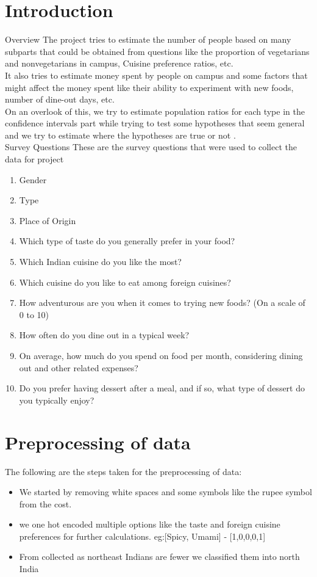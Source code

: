 \documentclass[12pt]{article}
\subtitle{MA4240 - Applied Statistics}
\date{\today}
\date{\today}
\begin{document}
\section{Introduction}
{Overview }
The project tries to estimate the number of people based on many subparts that could be obtained from questions like the proportion of vegetarians and nonvegetarians in campus, Cuisine preference ratios, etc.\\
It also tries to estimate money spent by people on campus and some factors that might affect the money spent like their ability to experiment with new foods, number of dine-out days, etc.\\
On an overlook of this, we try to estimate population ratios for each type in the confidence intervals part while trying to test some hypotheses that seem general and we try to estimate where the hypotheses are true or not .\\


{Survey Questions}
These are the survey questions that were used to collect the data for project
        \begin{enumerate}
            \item Gender
            \item Type
            \item Place of Origin
            \item Which type of taste do you generally prefer in your food?
            \item Which Indian cuisine do you like the most?
            \item Which cuisine do you like to eat among foreign cuisines?
            \item How adventurous are you when it comes to trying new foods? (On a scale of 0 to 10)
            \item How often do you dine out in a typical week?
            \item On average, how much do you spend on food per month, considering dining out and other related expenses?
            \item Do you prefer having dessert after a meal, and if so, what type of dessert do you typically enjoy?
        \end{enumerate}

\section{Preprocessing of data}
The following are the steps taken for the preprocessing of data:
\begin{itemize}
    \item We started by removing white spaces and some symbols like the rupee symbol from the cost.
    \item we one hot encoded multiple options like the taste and foreign cuisine preferences for further calculations.
    eg:[Spicy, Umami] - [1,0,0,0,1]
    \item From collected as northeast Indians are fewer we classified them into north India
\end{itemize}
\end{document}
